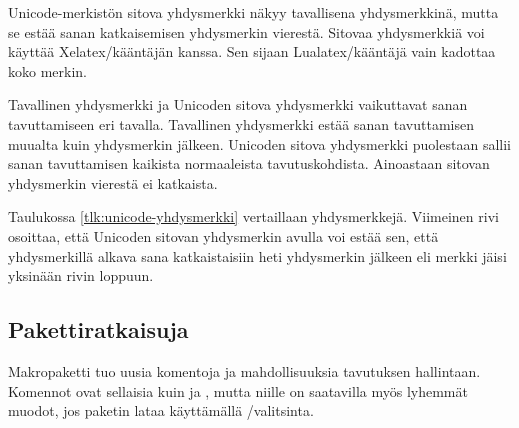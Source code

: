 Unicode-merkistön sitova yhdysmerkki  näkyy tavallisena yhdysmerkkinä, mutta se estää sanan
katkaisemisen yhdysmerkin vierestä. Sitovaa yhdysmerkkiä voi käyttää
Xelatex\-/kääntäjän kanssa. Sen sijaan Lualatex\-/kääntäjä vain kadottaa
koko merkin.

Tavallinen yhdysmerkki  ja Unicoden
sitova yhdysmerkki  vaikuttavat sanan tavuttamiseen eri
tavalla. Tavallinen yhdysmerkki estää sanan tavuttamisen muualta kuin
yhdysmerkin jälkeen. Unicoden sitova yhdysmerkki puolestaan sallii sanan
tavuttamisen kaikista normaaleista tavutuskohdista. Ainoastaan sitovan
yhdysmerkin vierestä ei katkaista.


Taulukossa \ref{tlk:unicode-yhdysmerkki} vertaillaan yhdysmerkkejä.
Viimeinen rivi osoittaa, että Unicoden sitovan yhdysmerkin avulla voi
estää sen, että yhdysmerkillä alkava sana katkaistaisiin heti
yhdysmerkin jälkeen eli merkki jäisi yksinään rivin loppuun.

\subsection{Pakettiratkaisuja}

Makropaketti  tuo uusia komentoja ja mahdollisuuksia
tavutuksen hallintaan. Komennot ovat sellaisia kuin  ja , mutta niille on saatavilla myös
lyhemmät muodot, jos paketin lataa käyttämällä
\-/valitsinta.

\begin{koodilohkosis}
  \usepackage[shortcuts]{extdash}
\end{koodilohkosis}

